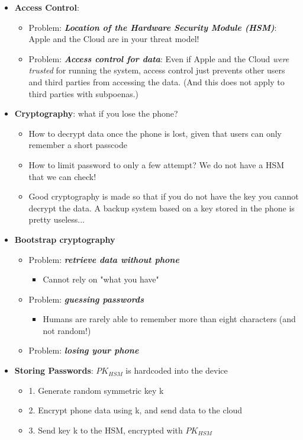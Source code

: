 \documentclass[11pt]{article}
\begin{document}
\begin{itemize}
	\item \textbf{Access Control}:
		\begin{itemize}
			\item Problem: \textbf{\textit{Location of the Hardware Security Module (HSM)}}: Apple and the Cloud are in your threat model!
			\item Problem: \textbf{\textit{Access control for data}}: Even if Apple and the Cloud \textit{were trusted} for running the system, access control just prevents other users and third parties from accessing the data. (And this does not apply to third parties with subpoenas.)
\end{itemize}
	\item \textbf{Cryptography}: what if you lose the phone? 
		\begin{itemize}
			\item How to decrypt data once the phone is lost, given that users can only remember a short passcode
			\item How to limit password to only a few attempt? We do not have a HSM that we can check!
			\item Good cryptography is made so that if you do not have the key you cannot decrypt the data. A backup system based on a key stored in the phone is pretty useless...
		\end{itemize}
	\item \textbf{Bootstrap cryptography}
		\begin{itemize}
			\item Problem: \textbf{\textit{retrieve data without phone}}
				\begin{itemize}
					\item Cannot rely on "what you have"
				\end{itemize}
			\item Problem: \textbf{\textit{guessing passwords}}
				\begin{itemize}
					\item Humans are rarely able to remember more than eight characters (and not random!)
				\end{itemize}
			\item Problem: \textbf{\textit{losing your phone}}
\end{itemize}
		
\item \textbf{Storing Passwords}: $PK_{HSM}$ is hardcoded into the device
	\begin{itemize}
		\item 1. Generate random symmetric key k 
		\item 2. Encrypt phone data using k, and send data to the cloud
		\item 3. Send key k to the HSM, encrypted with $PK_{HSM}$
\end{itemize}
	
\end{itemize}
\end{document}
